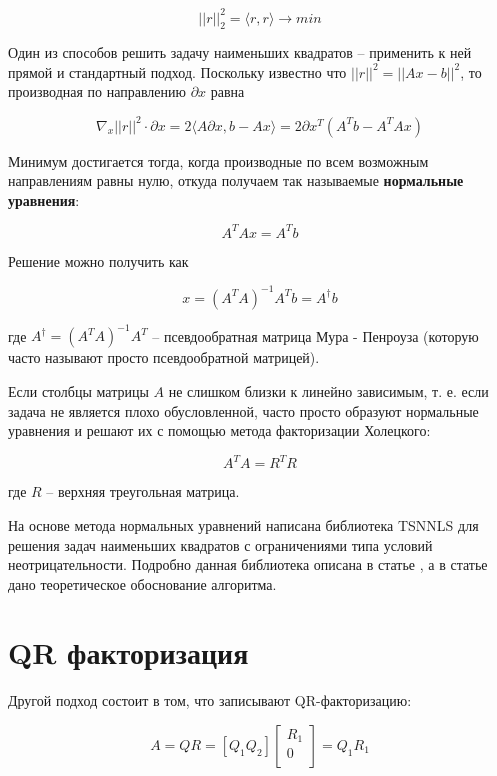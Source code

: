 \documentclass[a4paper, 12pt, titlepage]{article}
\theoremstyle{definition}
\theoremstyle{plain}
\theoremstyle{plain}
\begin{document}
$$
||r||^{2}_{2} = \langle r, r \rangle \to min
$$

Один из способов решить задачу наименьших квадратов -- применить к ней прямой
и стандартный подход. Поскольку известно что $||r||^{2} = ||A x - b||^{2}$, то
производная по направлению $\partial x$ равна

$$
\nabla_{x} ||r||^{2} \cdot \partial x = 2 \langle A \partial x, b - A x\rangle =
2 \partial x^{T} (A^{T} b - A^{T} A x)
$$

Минимум достигается тогда, когда производные по всем возможным направлениям 
равны нулю, откуда получаем так называемые \textbf{нормальные уравнения}:

\begin{equation}
 A^{T} A x = A^{T} b
\end{equation}

Решение можно получить как

\begin{equation}
 x = (A^{T} A)^{-1} A^{T} b = A^{\dag} b
\end{equation}

где $A^{\dag} = (A^{T} A)^{-1} A^{T}$ -- псевдообратная матрица Мура - Пенроуза
(которую часто называют просто псевдообратной матрицей).

Если столбцы матрицы $A$ не слишком близки к линейно зависимым, т. е. если 
задача не является плохо обусловленной, часто просто образуют нормальные 
уравнения и решают их с помощью метода факторизации Холецкого:

\begin{equation}
 A^{T} A = R^{T} R
\end{equation}

где $R$ -- верхняя треугольная матрица.

На основе метода нормальных уравнений написана библиотека TSNNLS для решения
задач наименьших квадратов с ограничениями типа условий неотрицательности.
Подробно данная библиотека описана в статье \cite{CantarellaPiatek2004}, а в
статье \cite{Portugal1994} дано теоретическое обоснование алгоритма.

\section{QR факторизация}

Другой подход состоит в том, что записывают QR-факторизацию:

\begin{equation}
 A = Q R = [Q_{1} Q_{2}]\left[\begin{array}{c}
                               R_{1} \\
                               0 \\
                              \end{array}
\right] = Q_{1} R_{1}
\end{equation}
\end{document}
